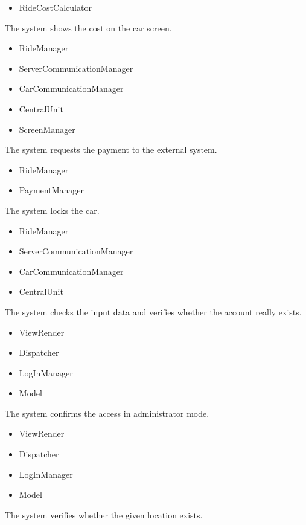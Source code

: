 \documentclass[11pt,a4paper]{report}
\begin{document}
\begin{Req}
\begin{itemize}
				\item RideCostCalculator
			\end{itemize}
		\item The system shows the cost on the car screen.
			\begin{itemize}
				\item RideManager
				\item ServerCommunicationManager
				\item CarCommunicationManager
				\item CentralUnit
				\item ScreenManager 
			\end{itemize}
		\item The system requests the payment to the external system.
			\begin{itemize}
				\item RideManager
				\item PaymentManager 
			\end{itemize}
		\item The system locks the car.
			\begin{itemize}
				\item RideManager
				\item ServerCommunicationManager
				\item CarCommunicationManager
				\item CentralUnit
			\end{itemize}
		\item The system checks the input data and verifies whether the account really exists.
			\begin{itemize}
				\item ViewRender
				\item Dispatcher
				\item LogInManager
				\item Model
			\end{itemize}
		\item The system confirms the access in administrator mode.
			\begin{itemize}
				\item ViewRender
				\item Dispatcher
				\item LogInManager
				\item Model
			\end{itemize}
		\item The system verifies whether the given location exists.

\end{Req}
\end{document}
